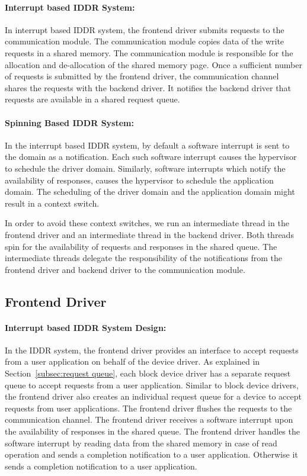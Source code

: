 \paragraph{Interrupt based IDDR System:}
\label{par:base IDDR communication}
In interrupt based IDDR system, the frontend driver submits requests to the communication module. The communication module copies data of the write requests in a shared memory. The communication module is responsible for the allocation and de-allocation of the shared memory page. Once a sufficient number of requests is submitted by the frontend driver, the communication channel shares the requests with the backend driver. It notifies the backend driver that requests are available in a shared request queue.

\paragraph{Spinning Based IDDR System:}
\label{par:spin IDDR communication}
In the interrupt based IDDR system, by default a software interrupt is sent to the domain as a notification. Each such software interrupt causes the hypervisor to schedule the driver domain. Similarly, software interrupts which notify the availability of responses, causes the hypervisor to schedule the application domain. The scheduling of the driver domain and the application domain might result in a context switch. 

In order to avoid these context switches, we run an intermediate thread in the frontend driver and an intermediate thread in the backend driver. Both threads spin for the availability of requests and responses in the shared queue. The intermediate threads delegate the responsibility of the notifications from the frontend driver and backend driver to the communication module. 

\subsection{Frontend Driver}
\paragraph{Interrupt based IDDR System Design:}
In the IDDR system, the frontend driver provides an interface to accept requests from a user application on behalf of the device driver. As explained in Section~\ref{subsec:request queue}, each block device driver has a separate request queue to accept requests from a user application. Similar to block device drivers, the frontend driver also creates an individual request queue for a device to accept requests from user applications. The frontend driver flushes the requests to the communication channel. The frontend driver receives a software interrupt upon the availability of responses in the shared queue. The frontend driver handles the software interrupt by reading data from the shared memory in case of read operation and sends a completion notification to a user application. Otherwise it sends a completion notification to a user application.

